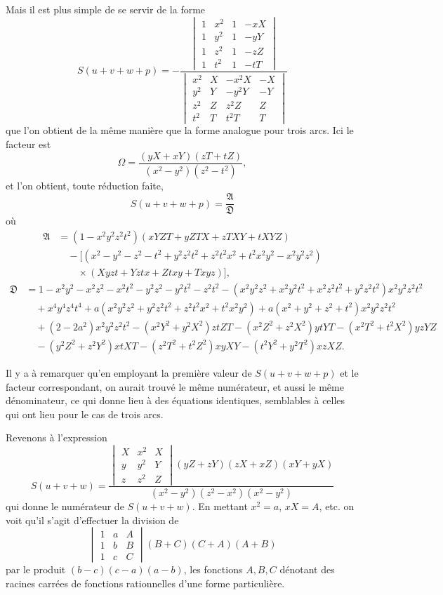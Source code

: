 \documentclass[11pt,a4paper]{book}
\begin{document}
Mais il est plus simple de se servir de la forme
\[
S(u + v + w + p) = -\frac{
\begin{vmatrix}
1 & x^2 & 1 & -xX \\
1 & y^2 & 1 & -yY \\
1 & z^2 & 1 & -zZ \\
1 & t^2 & 1 & -tT
\end{vmatrix}}{
\begin{vmatrix}
x^2 & X & -x^2X & -X \\
y^2 & Y & -y^2Y & -Y \\
z^2 & Z & z^2Z & Z \\
t^2 & T & t^2T & T
\end{vmatrix}}
\]
que l'on obtient de la m\^{e}me mani\`{e}re que la forme analogue pour trois arcs. Ici le facteur est
\[
\Omega = \frac{(yX + xY)(zT + tZ)}{(x^2 - y^2)(z^2 - t^2)},
\]
et l'on obtient, toute r\'{e}duction faite,
\[
S(u + v + w + p) = \frac{\mathfrak{A}}{\mathfrak{D}}
\]
o\`{u}
\begin{align*}
\mathfrak{A} &= (1 - x^2y^2z^2t^2)(xYZT + yZTX + zTXY + tXYZ) \\
&\quad - [(x^2 - y^2 - z^2 - t^2 + y^2z^2t^2 + z^2t^2x^2 + t^2x^2y^2 - x^2y^2z^2) \\
&\qquad \times (Xyzt + Yztx + Ztxy + Txyz)],
\end{align*}
\begin{align*}
\mathfrak{D} &= 1 - x^2y^2 - x^2z^2 - x^2t^2 - y^2z^2 - y^2t^2 - z^2t^2 - (x^2y^2z^2 + x^2y^2t^2 + x^2z^2t^2 + y^2z^2t^2)x^2y^2z^2t^2 \\
&\quad + x^4y^4z^4t^4 + a(x^2y^2z^2 + y^2z^2t^2 + z^2t^2x^2 + t^2x^2y^2) + a(x^2 + y^2 + z^2 + t^2)x^2y^2z^2t^2 \\
&\quad + (2 - 2a^2)x^2y^2z^2t^2 - (x^2Y^2 + y^2X^2)ztZT - (x^2Z^2 + z^2X^2)ytYT - (x^2T^2 + t^2X^2)yzYZ \\
&\quad - (y^2Z^2 + z^2Y^2)xtXT - (z^2T^2 + t^2Z^2)xyXY - (t^2Y^2 + y^2T^2)xzXZ.
\end{align*}

Il y a \`{a} remarquer qu'en employant la premi\`{e}re valeur de $S(u + v + w + p)$ et le facteur correspondant, on aurait trouv\'{e} le m\^{e}me num\'{e}rateur, et aussi le m\^{e}me d\'{e}nominateur, ce qui donne lieu \`{a} des \'{e}quations identiques, semblables \`{a} celles qui ont lieu pour le cas de trois arcs.

Revenons \`{a} l'expression
\[
S(u + v + w) = \frac{
\begin{vmatrix}
X & x^2 & X \\
y & y^2 & Y \\
z & z^2 & Z
\end{vmatrix}
(yZ + zY)(zX + xZ)(xY + yX)}{(x^2 - y^2)(z^2 - x^2)(x^2 - y^2)}
\]
qui donne le num\'{e}rateur de $S(u + v + w)$. En mettant $x^2 = a$, $xX = A$, etc. on voit qu'il s'agit d'effectuer la division de
\[
\begin{vmatrix}
1 & a & A \\
1 & b & B \\
1 & c & C
\end{vmatrix}(B + C)(C + A)(A + B)
\]
par le produit $(b - c)(c - a)(a - b)$, les fonctions $A, B, C$ d\'{e}notant des racines carr\'{e}es de fonctions rationnelles d'une forme particuli\`{e}re.
\end{document}
